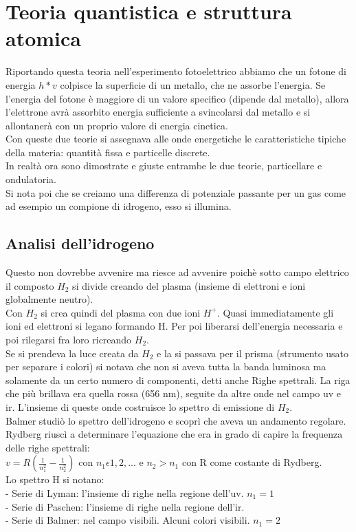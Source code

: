 \section{Teoria quantistica e struttura atomica}
Riportando questa teoria nell'esperimento fotoelettrico abbiamo che un fotone di energia $h * v$ colpisce la superficie di un metallo, che ne assorbe l'energia. Se l'energia del fotone è maggiore di un valore specifico (dipende dal metallo), allora l'elettrone avrà assorbito energia sufficiente a svincolarsi dal metallo e si allontanerà con un proprio valore di energia cinetica.\\
Con queste due teorie si assegnava alle onde energetiche le caratteristiche tipiche della materia: quantità fissa e particelle discrete.\\
In realtà ora sono dimostrate e giuste entrambe le due teorie, particellare e ondulatoria.\\
Si nota poi che se creiamo una differenza di potenziale passante per un gas come ad esempio un compione di idrogeno, esso si illumina.
\subsection{Analisi dell'idrogeno}
Questo non dovrebbe avvenire ma riesce ad avvenire poichè sotto campo elettrico il composto $H_2$ si divide creando del plasma (insieme di elettroni e ioni globalmente neutro).\\
Con $H_2$ si crea quindi del plasma con due ioni $H^+$. Quasi immediatamente gli ioni ed elettroni si legano formando H. Per poi liberarsi dell'energia necessaria e poi rilegarsi fra loro ricreando $H_2$.\\
Se si prendeva la luce creata da $H_2$ e la si passava per il prisma (strumento usato per separare i colori) si notava che non si aveva tutta la banda luminosa ma solamente da un certo numero di componenti, detti anche Righe spettrali. La riga che più brillava era quella rossa (656 nm), seguite da altre onde nel campo uv e ir. L'insieme di queste onde costruisce lo spettro di emissione di $H_2$.\\
Balmer studiò lo spettro dell'idrogeno e scoprì che aveva un andamento regolare.\\
Rydberg riuscì a determinare l'equazione che era in grado di capire la frequenza delle righe spettrali:\\
$v = R\left(\frac{1}{n_1^2} - \frac{1}{n_2^2}\right)$ con $n_1 \epsilon {1, 2, ...}$ e $n_2 > n_1$ con R come costante di Rydberg.\\
Lo spettro H si notano: \\
\tab- Serie di Lyman: l'insieme di righe nella regione dell'uv. $n_1 = 1$\\
\tab- Serie di Paschen: l'insieme di righe nella regione dell'ir.\\
\tab- Serie di Balmer: nel campo visibili. Alcuni colori visibili. $n_1 = 2$\\
